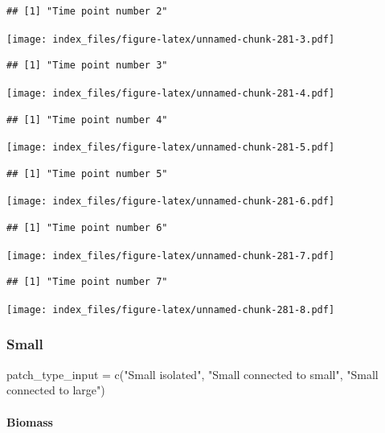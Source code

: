 \documentclass[
]{article}
\newenvironment{Shaded}{\begin{snugshade}}{\end{snugshade}}
\newcommand{\FunctionTok}[1]{\textcolor[rgb]{0.00,0.00,0.00}{#1}}
\newcommand{\NormalTok}[1]{#1}
\newcommand{\OtherTok}[1]{\textcolor[rgb]{0.56,0.35,0.01}{#1}}
\newcommand{\StringTok}[1]{\textcolor[rgb]{0.31,0.60,0.02}{#1}}
\begin{document}
\begin{verbatim}
## [1] "Time point number 2"
\end{verbatim}

\texttt{[image: index\_files/figure-latex/unnamed-chunk-281-3.pdf]}

\begin{verbatim}
## [1] "Time point number 3"
\end{verbatim}

\texttt{[image: index\_files/figure-latex/unnamed-chunk-281-4.pdf]}

\begin{verbatim}
## [1] "Time point number 4"
\end{verbatim}

\texttt{[image: index\_files/figure-latex/unnamed-chunk-281-5.pdf]}

\begin{verbatim}
## [1] "Time point number 5"
\end{verbatim}

\texttt{[image: index\_files/figure-latex/unnamed-chunk-281-6.pdf]}

\begin{verbatim}
## [1] "Time point number 6"
\end{verbatim}

\texttt{[image: index\_files/figure-latex/unnamed-chunk-281-7.pdf]}

\begin{verbatim}
## [1] "Time point number 7"
\end{verbatim}

\texttt{[image: index\_files/figure-latex/unnamed-chunk-281-8.pdf]}

\hypertarget{small}{%
\subsubsection{Small}\label{small}}

\begin{Shaded}
\begin{Highlighting}[]
\NormalTok{patch\_type\_input }\OtherTok{=} \FunctionTok{c}\NormalTok{(}\StringTok{"Small isolated"}\NormalTok{,}
                     \StringTok{"Small connected to small"}\NormalTok{,}
                     \StringTok{"Small connected to large"}\NormalTok{)}
\end{Highlighting}
\end{Shaded}

\hypertarget{biomass-4}{%
\paragraph{Biomass}\label{biomass-4}}
\end{document}
